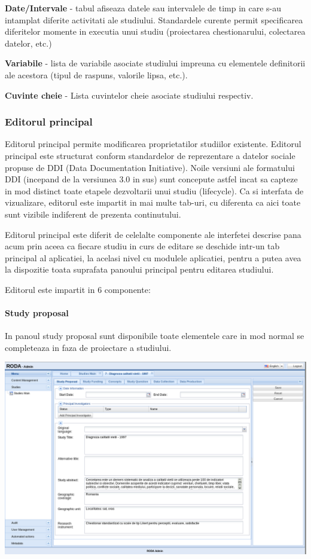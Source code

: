 \textbf{Date/Intervale} - tabul afiseaza datele sau intervalele de timp in care s-au intamplat diferite activitati ale studiului. Standardele curente     permit specificarea diferitelor momente in executia unui studiu (proiectarea chestionarului, colectarea datelor, etc.)

\textbf{Variabile} - lista de variabile asociate studiului impreuna cu elementele definitorii ale acestora (tipul de raspuns, valorile lipsa, etc.). 

\textbf{Cuvinte cheie} - Lista cuvintelor cheie asociate studiului respectiv. 


\subsubsection{Editorul principal}

Editorul principal permite modificarea proprietatilor studiilor existente. Editorul principal este structurat conform standardelor de reprezentare a datelor sociale propuse de DDI (Data Documentation Initiative). Noile versiuni ale formatului DDI (incepand de la versiunea 3.0 in sus) sunt concepute astfel incat sa capteze in mod distinct toate etapele dezvoltarii unui studiu (lifecycle). Ca si interfata de vizualizare, editorul este impartit in mai multe tab-uri, cu diferenta ca aici toate sunt vizibile indiferent de prezenta continutului. 

Editorul principal este diferit de celelalte componente ale interfetei descrise pana acum prin aceea ca fiecare studiu in curs de editare se deschide intr-un tab principal al aplicatiei, la acelasi nivel cu modulele aplicatiei, pentru a putea avea la dispozitie toata suprafata panoului principal pentru editarea studiului. 

Editorul este impartit in 6 componente:

\paragraph{Study proposal}

In panoul study proposal sunt disponibile toate elementele care in mod normal se completeaza in faza de proiectare a studiului. 

\includegraphics[width=16cm]{img/studyedit-proposal}


